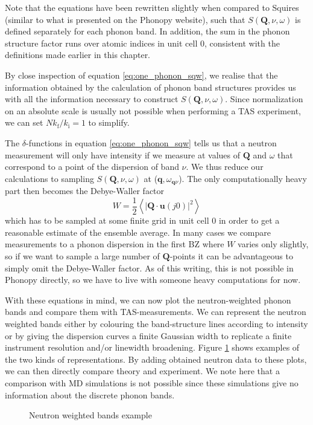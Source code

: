 Note that the equations have been rewritten slightly when compared to Squires (similar to what is presented on the Phonopy website), such that $S(\bm{Q},\nu,\omega)$ is defined separately for each phonon band. In addition, the sum in the phonon structure factor runs over atomic indices in unit cell 0, consistent with the definitions made earlier in this chapter.

By close inspection of equation \eqref{eq:one_phonon_sqw}, we realise that the information obtained by the calculation of phonon band structures provides us with all the information necessary to construct $S(\bm{Q},\nu,\omega)$. Since normalization on an absolute scale is usually not possible when performing a TAS experiment, we can set $N k_\text{f} / k_\text{i} = 1$ to simplify.

The $\delta$-functions in equation \eqref{eq:one_phonon_sqw} tells us that a neutron measurement will only have intensity if we measure at values of $\bm{Q}$ and $\omega$ that correspond to a point of the dispersion of band $\nu$. We thus reduce our calculations to sampling $S(\bm{Q},\nu,\omega)$ at ($\bm{q},\omega_{\bm{q}\nu}$). The only computationally heavy part then becomes the Debye-Waller factor
%
\[ W = \frac{1}{2} \left\langle | \bm{Q} \cdot \bm{u}(j0) |^2 \right\rangle \]
%
which has to be sampled at some finite grid in unit cell 0 in order to get a reasonable estimate of the ensemble average. In many cases we compare measurements to a phonon dispersion in the first BZ where $W$ varies only slightly, so if we want to sample a large number of $\bm{Q}$-points it can be advantageous to simply omit the Debye-Waller factor. As of this writing, this is not possible in Phonopy directly, so we have to live with someone heavy computations for now.

With these equations in mind, we can now plot the neutron-weighted phonon bands and compare them with TAS-measurements. We can represent the neutron weighted bands either by colouring the band-structure lines according to intensity or by giving the dispersion curves a finite Gaussian width to replicate a finite instrument resolution and/or linewidth broadening. Figure \ref{fig:bands_sqw_color_line} shows examples of the two kinds of representations. By adding obtained neutron data to these plots, we can then directly compare theory and experiment. We note here that a comparison with MD simulations is not possible since these simulations give no information about the discrete phonon bands.

\begin{figure}
	\centering
	\caption[Neutron weighted bands example]{Neutron weighted bands example}
	\label{fig:bands_sqw_color_line}
\end{figure}

